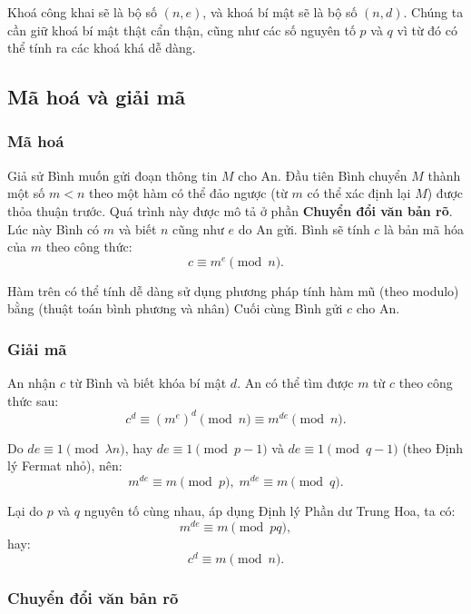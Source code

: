 Khoá công khai sẽ là bộ số $(n,e)$, và khoá bí mật sẽ là bộ số $(n,d)$. Chúng ta cần giữ khoá bí mật thật cẩn thận, cũng như các số nguyên tố $p$ và $q$ vì từ đó có thể tính ra các khoá khá dễ dàng.

\subsection{Mã hoá và giải mã}

\subsubsection*{Mã hoá}

Giả sử Bình muốn gửi đoạn thông tin $M$ cho An. Đầu tiên Bình chuyển $M$ thành một số $m<n$ theo một hàm có thể đảo ngược (từ $m$ có thể xác định lại $M$) được thỏa thuận trước. Quá trình này được mô tả ở phần \textbf{Chuyển đổi văn bản rõ}.\\

Lúc này Bình có $m$ và biết $n$ cũng như $e$ do An gửi. Bình sẽ tính $c$ là bản mã hóa của $m$ theo công thức:
$$
c\equiv m^e\pmod{n}.
$$

Hàm trên có thể tính dễ dàng sử dụng phương pháp tính hàm mũ (theo modulo) bằng (thuật toán bình phương và nhân) Cuối cùng Bình gửi $c$ cho An.

\subsubsection*{Giải mã}

An nhận $c$ từ Bình và biết khóa bí mật $d$. An có thể tìm được $m$ từ $c$ theo công thức sau:
$$
c^d\equiv(m^e)^d\pmod{n}\equiv m^{de}\pmod{n}.
$$

Do $de\equiv 1\pmod{\lambda{n}}$, hay $de\equiv1\pmod{p-1}$ và $de\equiv1\pmod{q-1}$ (theo Định lý Fermat nhỏ), nên:
$$
m^{de}\equiv m\pmod{p},\;m^{de}\equiv m\pmod{q}.
$$

Lại do $p$ và $q$ nguyên tố cùng nhau, áp dụng Định lý Phần dư Trung Hoa, ta có:
$$
m^{de}\equiv m\pmod{pq},
$$
hay:
$$
c^d\equiv m\pmod{n}.
$$

\subsubsection*{Chuyển đổi văn bản rõ}

